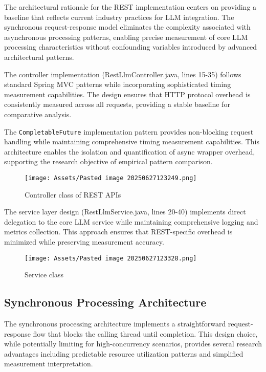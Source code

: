 The architectural rationale for the REST implementation centers on providing a baseline that reflects current industry practices for LLM integration. The synchronous request-response model eliminates the complexity associated with asynchronous processing patterns, enabling precise measurement of core LLM processing characteristics without confounding variables introduced by advanced architectural patterns.

The controller implementation (RestLlmController.java, lines 15-35) follows standard Spring MVC patterns while incorporating sophisticated timing measurement capabilities. The design ensures that HTTP protocol overhead is consistently measured across all requests, providing a stable baseline for comparative analysis.

The \texttt{CompletableFuture} implementation pattern provides non-blocking request handling while maintaining comprehensive timing measurement capabilities. This architecture enables the isolation and quantification of async wrapper overhead, supporting the research objective of empirical pattern comparison.
\begin{figure}[H]
    \centering
    \texttt{[image: Assets/Pasted image 20250627123249.png]}
    \caption{Controller class of REST APIs}
\end{figure}

The service layer design (RestLlmService.java, lines 20-40) implements direct delegation to the core LLM service while maintaining comprehensive logging and metrics collection. This approach ensures that REST-specific overhead is minimized while preserving measurement accuracy.

\begin{figure}[H]
    \centering
    \texttt{[image: Assets/Pasted image 20250627123328.png]}
    \caption{Service class}
\end{figure}

\subsection{Synchronous Processing Architecture}

The synchronous processing architecture implements a straightforward request-response flow that blocks the calling thread until completion. This design choice, while potentially limiting for high-concurrency scenarios, provides several research advantages including predictable resource utilization patterns and simplified measurement interpretation.


